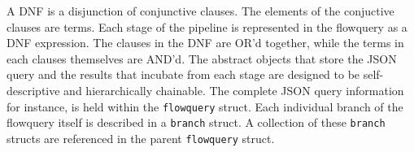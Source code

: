 A \ac{DNF} is a disjunction of conjunctive clauses. The elements of the
conjuctive clauses are terms. Each stage of the pipeline is represented in the
flowquery as a \ac{DNF} expression. The clauses in the \ac{DNF} are OR'd
together, while the terms in each clauses themselves are AND'd. The abstract
objects that store the JSON query and the results that incubate from each
stage are designed to be self-descriptive and hierarchically chainable. The
complete JSON query information for instance, is held within the
\texttt{flowquery} struct. Each individual branch of the flowquery itself is
described in a \texttt{branch} struct. A collection of these \texttt{branch}
structs are referenced in the parent \texttt{flowquery} struct.

